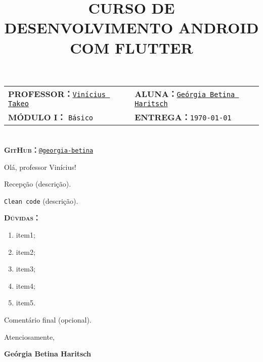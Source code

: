 \documentclass[12pt,a4paper]{article}
\begin{document}
\date{}
\title{
{ \textbf{\textsc{ \color{purple}CURSO DE DESENVOLVIMENTO ANDROID COM FLUTTER}}
}
}

\maketitle
\thispagestyle{fancy}
\vspace{-2cm}
\begin{tabular}{lm{0.5cm}l}
    \small\textbf{\textsc{PROFESSOR：}}\underline{\texttt{Vinícius Takeo}} & &
    \small\textbf{\textsc{ALUNA：}}\underline{\texttt{Geórgia Betina Haritsch}} \\
    \small\textsc{\textbf{MÓDULO I：}} \texttt{Básico} & & \small\textsc{\textbf{ENTREGA：}}\texttt{\today} \\
\end{tabular}

\author{}

\vspace{1.5cm}

\noindent

\section*{}

\noindent
{\bf \textsc{GitHub：}}\href{}{\texttt{@georgia-betina}}

\vspace{5pt}
\noindent
\textsf{Olá, professor Vinícius!}

\noindent
\textsf{Recepção (descrição).}

\noindent
\textsf{\texttt{Clean code} (descrição).}

\vspace{1.2cm}
\noindent
\textsc{\textbf{Dúvidas：}}
\noindent
\begin{enumerate}[label=\color{azulEscuro}{\texttt{\textbf{\arabic*.}}}]
    \itemsep 0em
    \item \textsf{item1;}
    \item \textsf{item2;}
    \item \textsf{item3;}
    \item \textsf{item4;}
    \item \textsf{item5.}
\end{enumerate}

\vspace{1.2cm}

\noindent
\textsf{Comentário final (opcional).}

\hfill

\noindent
\textsf{Atenciosamente,}

\noindent
\textsf{\textbf{Geórgia Betina Haritsch}}
\end{document}
